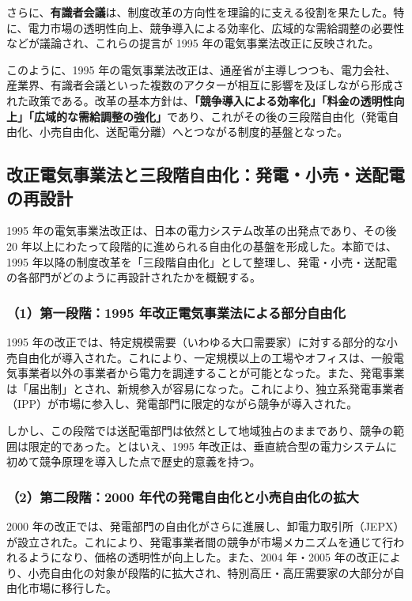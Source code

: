 さらに、\textbf{有識者会議}は、制度改革の方向性を理論的に支える役割を果たした。特に、電力市場の透明性向上、競争導入による効率化、広域的な需給調整の必要性などが議論され、これらの提言が 1995 年の電気事業法改正に反映された\parencite{Expert1995Reform}。

このように、1995 年の電気事業法改正は、通産省が主導しつつも、電力会社、産業界、有識者会議といった複数のアクターが相互に影響を及ぼしながら形成された政策である。改革の基本方針は、\textbf{「競争導入による効率化」「料金の透明性向上」「広域的な需給調整の強化」}であり、これがその後の三段階自由化（発電自由化、小売自由化、送配電分離）へとつながる制度的基盤となった。

\subsection{改正電気事業法と三段階自由化：発電・小売・送配電の再設計}

1995 年の電気事業法改正は、日本の電力システム改革の出発点であり、その後 20 年以上にわたって段階的に進められる自由化の基盤を形成した。本節では、1995 年以降の制度改革を「三段階自由化」として整理し、発電・小売・送配電の各部門がどのように再設計されたかを概観する。

\subsubsection{（1）第一段階：1995 年改正電気事業法による部分自由化}

1995 年の改正では、特定規模需要（いわゆる大口需要家）に対する部分的な小売自由化が導入された。これにより、一定規模以上の工場やオフィスは、一般電気事業者以外の事業者から電力を調達することが可能となった。また、発電事業は「届出制」とされ、新規参入が容易になった。これにより、独立系発電事業者（IPP）が市場に参入し、発電部門に限定的ながら競争が導入された\parencite{METI1995Reform}。

しかし、この段階では送配電部門は依然として地域独占のままであり、競争の範囲は限定的であった。とはいえ、1995 年改正は、垂直統合型の電力システムに初めて競争原理を導入した点で歴史的意義を持つ。

\subsubsection{（2）第二段階：2000 年代の発電自由化と小売自由化の拡大}

2000 年の改正では、発電部門の自由化がさらに進展し、卸電力取引所（JEPX）が設立された。これにより、発電事業者間の競争が市場メカニズムを通じて行われるようになり、価格の透明性が向上した。また、2004 年・2005 年の改正により、小売自由化の対象が段階的に拡大され、特別高圧・高圧需要家の大部分が自由化市場に移行した\parencite{METI2005Reform}。

